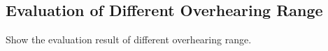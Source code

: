 %

{%
%
%
\subsection{Evaluation of Different Overhearing Range}
{\color{red}Show the evaluation result of different overhearing range.}
%
}
